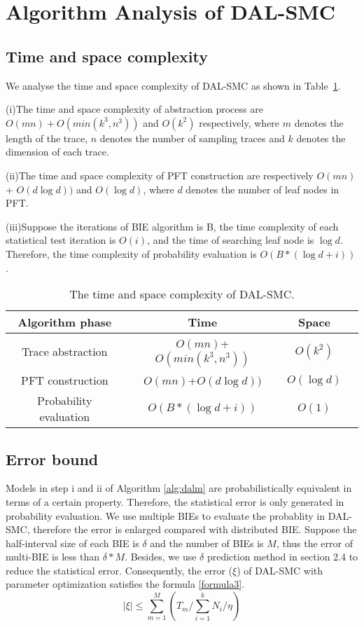 \section{Algorithm Analysis of DAL-SMC}
\subsection{Time and space complexity}
We analyse the time and space complexity of DAL-SMC as shown in Table~\ref{tb:complexity}.

(i)The time and space complexity of abstraction process are $O(mn)+O(min(k^3,n^3))$ and $O(k^2)$ respectively, where $m$ denotes the length of the trace, $n$ denotes the number of sampling traces and $k$ denotes the dimension of each trace.

(ii)The time and space complexity of PFT construction are respectively $O(mn)$ + $O(d\log{d}))$ and $O(\log{d})$, where $d$ denotes the number of leaf nodes in PFT.

(iii)Suppose the iterations of BIE algorithm is B, the time complexity of each statistical test iteration is $O(i)$, and the time of searching leaf node is $\log{d}$. Therefore, the time complexity of probability evaluation is $O(B*(\log{d}+i))$.
\begin{table}[t]
	\renewcommand{\arraystretch}{1.2}
	\caption{The time and space complexity of DAL-SMC.}
	\label{tb:complexity}
	\centering
	\begin{tabular}{c c c c}
		\hline
		Algorithm phase & Time  & Space\\
		\hline
		Trace abstraction &$O(mn)$+$O(min(k^3,n^3))$& $O(k^2)$ \\ 
		PFT construction &$O(mn)$+$O(d\log{d}))$& $O(\log{d})$ \\
		Probability evaluation &$O(B*(\log{d}+i))$& $O(1)$\\
		\hline
	\end{tabular}
\end{table}
\subsection{Error bound}
Models in step i and ii of Algorithm \ref{alg:dalm} are probabilistically equivalent in terms of a certain property. Therefore, the statistical error is only generated in probability evaluation. We use multiple BIEs to evaluate the probablity in DAL-SMC, therefore the error is enlarged compared with distributed BIE. Suppose the half-interval size of each BIE is $\delta$ and the number of BIEs is $M$, thus the error of multi-BIE is less than $\delta*M$. Besides, we use $\delta$ prediction method in section 2.4 to reduce the statistical error. Consequently, the error ($\xi$) of DAL-SMC with parameter optimization satisfies the formula \ref{formula3}.
\begin{equation}
\label{formula3}
| \xi | \leq \sum\limits_{m=1}^M (T_m / \sum\limits_{i=1}^k N_i / \eta)
\end{equation}